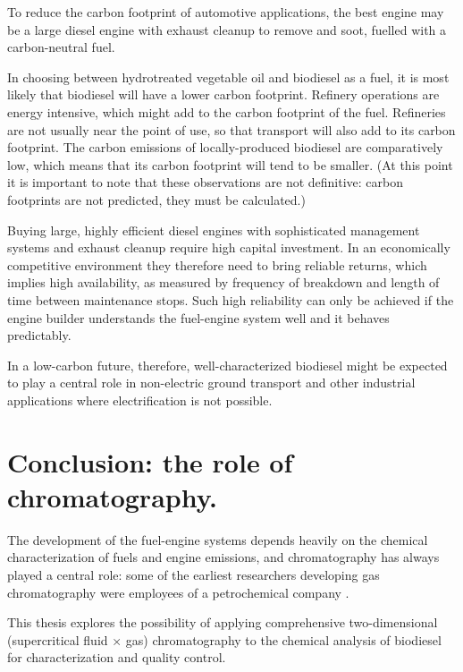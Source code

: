 To reduce the carbon footprint of automotive applications, the best engine may
be a large diesel engine with exhaust cleanup to remove \nox and soot, fuelled
with a carbon-neutral fuel.

In choosing between hydrotreated vegetable oil and biodiesel as a fuel, it is
most likely that biodiesel will have a lower carbon footprint. Refinery
operations are energy intensive, which might add to the carbon footprint of the
fuel. Refineries are not usually near the point of use, so that transport will
also add to its carbon footprint. The carbon emissions of locally-produced
biodiesel are comparatively low, which means that its carbon footprint will tend
to be smaller. (At this point it is important to note that these observations
are not definitive: carbon footprints are not predicted, they must be
calculated.)

Buying large, highly efficient diesel engines with sophisticated management
systems and exhaust cleanup require high capital investment. In an economically
competitive environment they therefore need to bring reliable returns, which
implies high availability, as measured by frequency of breakdown and length of
time between maintenance stops. Such high reliability can only be achieved if
the engine builder understands the fuel-engine system well and it behaves
predictably.

In a low-carbon future, therefore, well-characterized biodiesel might be
expected to play a central role in non-electric ground transport and other
industrial applications where electrification is not possible.

\section{Conclusion: the role of chromatography.}

The development of the fuel-engine systems depends heavily on the chemical
characterization of fuels and engine emissions, and chromatography has always
played a central role: some of the earliest researchers developing gas
chromatography were employees of a petrochemical company
\autocite{Keulemans1955}.

This thesis explores the possibility of applying comprehensive two-dimensional
(supercritical fluid ×  gas) chromatography to the chemical analysis of
biodiesel for characterization and quality control.


